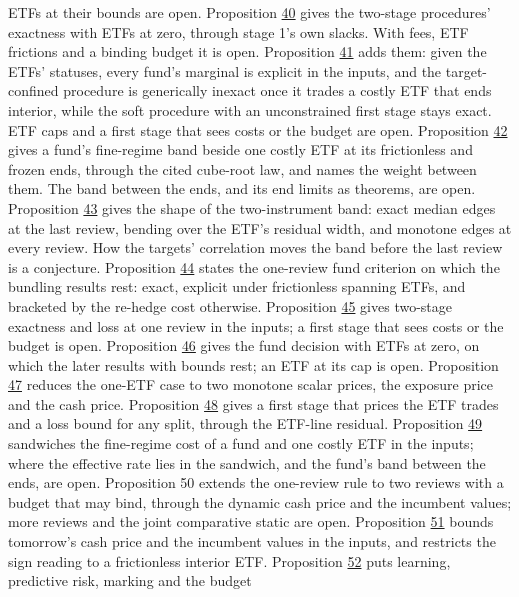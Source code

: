 \documentclass[11pt]{article}
\begin{document}
ETFs at their bounds are open.
Proposition \hyperref[res:Proposition-40]{40} gives the two-stage procedures' exactness with ETFs at
zero, through stage 1's own slacks. With fees, ETF frictions and a
binding budget it is open.
Proposition \hyperref[res:Proposition-41]{41} adds them: given the ETFs' statuses, every fund's
marginal is explicit in the inputs, and the target-confined procedure
is generically inexact once it trades a costly ETF that ends interior,
while the soft procedure with an unconstrained first stage stays exact.
ETF caps and a first stage that sees costs or the budget are open.
Proposition \hyperref[res:Proposition-42]{42} gives a fund's fine-regime band beside one costly ETF
at its frictionless and frozen ends, through the cited cube-root law,
and names the weight between them. The band between the ends, and its
end limits as theorems, are open.
Proposition \hyperref[res:Proposition-43]{43} gives the shape of the two-instrument band: exact
median edges at the last review, bending over the ETF's residual
width, and monotone edges at every review. How the targets'
correlation moves the band before the last review is a conjecture.
Proposition \hyperref[res:Proposition-44]{44} states the one-review fund criterion on which the
bundling results rest: exact, explicit under frictionless spanning
ETFs, and bracketed by the re-hedge cost otherwise. Proposition \hyperref[res:Proposition-45]{45}
gives two-stage exactness and loss at one review in the inputs; a
first stage that sees costs or the budget is open. Proposition \hyperref[res:Proposition-46]{46}
gives the fund decision with ETFs at zero, on which the later results
with bounds rest; an ETF at its cap is open. Proposition \hyperref[res:Proposition-47]{47} reduces
the one-ETF case to two monotone scalar prices, the exposure price and
the cash price. Proposition \hyperref[res:Proposition-48]{48} gives a first stage that prices the
ETF trades and a loss bound for any split, through the ETF-line
residual. Proposition \hyperref[res:Proposition-49]{49} sandwiches the fine-regime cost of a fund and
one costly ETF in the inputs; where the effective rate lies in the
sandwich, and the fund's band between the ends, are open. Proposition
50 extends the one-review rule to two reviews with a budget that may
bind, through the dynamic cash price and the incumbent values; more
reviews and the joint comparative static are open. Proposition \hyperref[res:Proposition-51]{51}
bounds tomorrow's cash price and the incumbent values in the inputs,
and restricts the sign reading to a frictionless interior ETF.
Proposition \hyperref[res:Proposition-52]{52} puts learning, predictive risk, marking and the budget
\end{document}
